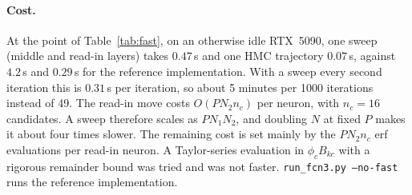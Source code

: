 \documentclass[11pt,a4paper]{article}
\begin{document}
\paragraph{Cost.}
At the point of Table~\ref{tab:fast}, on an otherwise idle RTX~5090, one sweep (middle and read-in layers) takes $0.47$\,s and one HMC trajectory $0.07$\,s, against $4.2$\,s and $0.29$\,s for the reference implementation.
With a sweep every second iteration this is $0.31$\,s per iteration, so about 5 minutes per 1000 iterations instead of 49.
The read-in move costs $O(P N_2 n_c)$ per neuron, with $n_c=16$ candidates. A sweep therefore scales as $P N_1 N_2$, and doubling $N$ at fixed $P$ makes it about four times slower.
The remaining cost is set mainly by the $P N_2 n_c$ erf evaluations per read-in neuron.
A Taylor-series evaluation in $\phi_c B_{kc}$ with a rigorous remainder bound was tried and was not faster.
\texttt{run\_fcn3.py --no-fast} runs the reference implementation.
\end{document}
